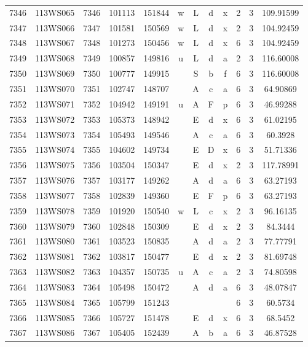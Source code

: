 \begin{tabular}{|*{12}{c|}}
7346 & 113WS065 & 7346 & 101113 & 151844 & w & L & d & x & 2 & 3 & 109.91599 \\ 
7347 & 113WS066 & 7347 & 101581 & 150569 & w & L & d & x & 2 & 3 & 104.92459 \\ 
7348 & 113WS067 & 7348 & 101273 & 150456 & w & L & d & x & 6 & 3 & 104.92459 \\ 
7349 & 113WS068 & 7349 & 100857 & 149816 & u & L & d & a & 2 & 3 & 116.60008 \\ 
7350 & 113WS069 & 7350 & 100777 & 149915 &  & S & b & f & 6 & 3 & 116.60008 \\ 
7351 & 113WS070 & 7351 & 102747 & 148707 &  & A & c & a & 6 & 3 & 64.90869 \\ 
7352 & 113WS071 & 7352 & 104942 & 149191 & u & A & F & p & 6 & 3 & 46.99288 \\ 
7353 & 113WS072 & 7353 & 105373 & 148942 &  & E & d & x & 6 & 3 & 61.02195 \\ 
7354 & 113WS073 & 7354 & 105493 & 149546 &  & A & c & a & 6 & 3 & 60.3928 \\ 
7355 & 113WS074 & 7355 & 104602 & 149734 &  & E & D & x & 6 & 3 & 51.71336 \\ 
7356 & 113WS075 & 7356 & 103504 & 150347 &  & E & d & x & 2 & 3 & 117.78991 \\ 
7357 & 113WS076 & 7357 & 103177 & 149262 &  & A & d & a & 6 & 3 & 63.27193 \\ 
7358 & 113WS077 & 7358 & 102839 & 149360 &  & E & F & p & 6 & 3 & 63.27193 \\ 
7359 & 113WS078 & 7359 & 101920 & 150540 & w & L & c & x & 2 & 3 & 96.16135 \\ 
7360 & 113WS079 & 7360 & 102848 & 150309 &  & E & d & x & 2 & 3 & 84.3444 \\ 
7361 & 113WS080 & 7361 & 103523 & 150835 &  & A & d & a & 2 & 3 & 77.77791 \\ 
7362 & 113WS081 & 7362 & 103817 & 150477 &  & E & d & x & 2 & 3 & 81.69748 \\ 
7363 & 113WS082 & 7363 & 104357 & 150735 & u & A & c & a & 2 & 3 & 74.80598 \\ 
7364 & 113WS083 & 7364 & 105498 & 150472 &  & A & d & a & 6 & 3 & 48.07847 \\ 
7365 & 113WS084 & 7365 & 105799 & 151243 &  &  &  &  & 6 & 3 & 60.5734 \\ 
7366 & 113WS085 & 7366 & 105727 & 151478 &  & E & d & x & 6 & 3 & 68.5452 \\ 
7367 & 113WS086 & 7367 & 105405 & 152439 &  & A & b & a & 6 & 3 & 46.87528 \\ 

\end{tabular}
